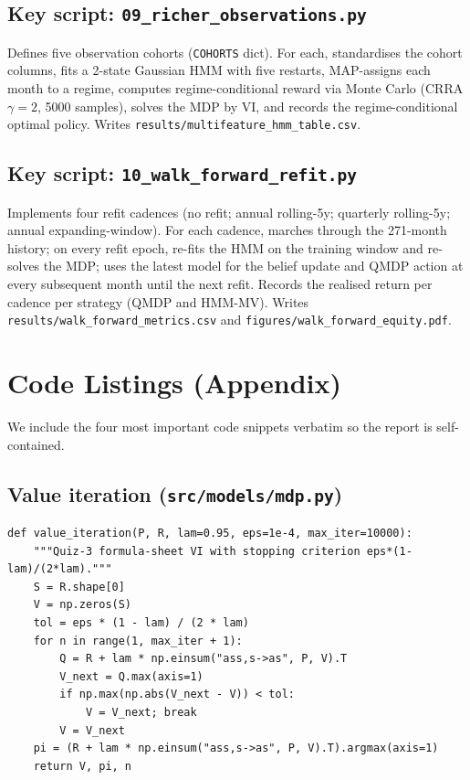 \documentclass[11pt]{article}
\theoremstyle{plain1}
\theoremstyle{definition1}
\newcommand{\1}{\mathbf{1}}
\begin{document}
\subsection{Key script: \texttt{09\_richer\_observations.py}}

Defines five observation cohorts (\texttt{COHORTS} dict). For each, standardises the cohort columns, fits a 2-state Gaussian HMM with five restarts, MAP-assigns each month to a regime, computes regime-conditional reward via Monte Carlo (CRRA $\gamma{=}2$, 5000 samples), solves the MDP by VI, and records the regime-conditional optimal policy. Writes \texttt{results/multifeature\_hmm\_table.csv}.

\subsection{Key script: \texttt{10\_walk\_forward\_refit.py}}

Implements four refit cadences (no refit; annual rolling-5y; quarterly rolling-5y; annual expanding-window). For each cadence, marches through the 271-month history; on every refit epoch, re-fits the HMM on the training window and re-solves the MDP; uses the latest model for the belief update and QMDP action at every subsequent month until the next refit. Records the realised return per cadence per strategy (QMDP and HMM-MV). Writes \texttt{results/walk\_forward\_metrics.csv} and \texttt{figures/walk\_forward\_equity.pdf}.

\section{Code Listings (Appendix)}\label{sec:code-appendix}

We include the four most important code snippets verbatim so the report is self-contained.

\subsection{Value iteration (\texttt{src/models/mdp.py})}
\begin{lstlisting}
def value_iteration(P, R, lam=0.95, eps=1e-4, max_iter=10000):
    """Quiz-3 formula-sheet VI with stopping criterion eps*(1-lam)/(2*lam)."""
    S = R.shape[0]
    V = np.zeros(S)
    tol = eps * (1 - lam) / (2 * lam)
    for n in range(1, max_iter + 1):
        Q = R + lam * np.einsum("ass,s->as", P, V).T
        V_next = Q.max(axis=1)
        if np.max(np.abs(V_next - V)) < tol:
            V = V_next; break
        V = V_next
    pi = (R + lam * np.einsum("ass,s->as", P, V).T).argmax(axis=1)
    return V, pi, n
\end{lstlisting}
\end{document}
